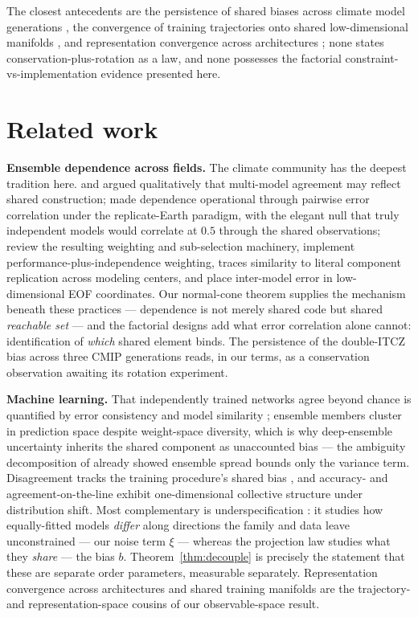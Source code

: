 \documentclass[11pt]{article}
\theoremstyle{remark}
\begin{document}
The closest antecedents are the persistence of shared biases across climate
model generations \citep{tian2020,knutti2013}, the convergence of training
trajectories onto shared low-dimensional manifolds \citep{mao2024}, and
representation convergence across architectures \citep{huh2024}; none states
conservation-plus-rotation as a law, and none possesses the factorial
constraint-vs-implementation evidence presented here.

\section{Related work}
\label{sec:related}

\textbf{Ensemble dependence across fields.} The climate community has the
deepest tradition here. \citep{pirtle2010} and \citep{parker2011} argued
qualitatively that multi-model agreement may reflect shared construction;
\citep{bishop2013} made dependence operational through pairwise error
correlation under the replicate-Earth paradigm, with the elegant null that
truly independent models would correlate at $0.5$ through the shared
observations; \citep{abramowitz2019} review the resulting weighting and
sub-selection machinery, \citep{knutti2017} implement
performance-plus-independence weighting, \citep{boe2018} traces similarity to
literal component replication across modeling centers, and
\citep{sanderson2015,brands2022} place inter-model error in low-dimensional
EOF coordinates. Our normal-cone theorem supplies the mechanism beneath
these practices --- dependence is not merely shared code but shared
\emph{reachable set} --- and the factorial designs add what error
correlation alone cannot: identification of \emph{which} shared element binds.
The persistence of the double-ITCZ bias across three CMIP generations
\citep{tian2020} reads, in our terms, as a conservation observation awaiting
its rotation experiment.

\textbf{Machine learning.} That independently trained networks agree beyond
chance is quantified by error consistency \citep{geirhos2020} and model
similarity \citep{mania2019}; ensemble members cluster in prediction space
\citep{fort2019} despite weight-space diversity, which is why deep-ensemble
uncertainty \citep{lakshminarayanan2017} inherits the shared component as
unaccounted bias --- the ambiguity decomposition of \citep{krogh1995} already
showed ensemble spread bounds only the variance term. Disagreement tracks the
training procedure's shared bias \citep{jiang2021}, and accuracy- and
agreement-on-the-line \citep{miller2021,baek2022} exhibit one-dimensional
collective structure under distribution shift. Most complementary is
underspecification \citep{damour2022}: it studies how equally-fitted models
\emph{differ} along directions the family and data leave unconstrained --- our
noise term $\xi$ --- whereas the projection law studies what they
\emph{share} --- the bias $b$. Theorem~\ref{thm:decouple} is precisely the
statement that these are separate order parameters, measurable separately.
Representation convergence across architectures \citep{huh2024} and shared
training manifolds \citep{mao2024} are the trajectory- and
representation-space cousins of our observable-space result.
\end{document}
